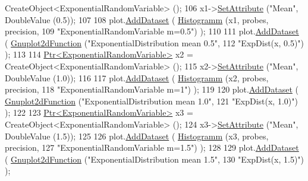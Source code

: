 \begin{DoxyCode}
      CreateObject<ExponentialRandomVariable> ();
106     x1->\hyperlink{classns3_1_1ObjectBase_ac60245d3ea4123bbc9b1d391f1f6592f}{SetAttribute} (\textcolor{stringliteral}{"Mean"}, DoubleValue (0.5));
107 
108     plot.\hyperlink{classns3_1_1Gnuplot_a306ec724a327cf9ab699700f31fca0a1}{AddDataset} ( \hyperlink{main-random-variable-stream_8cc_a2cfd3837ab3f2e816cf53486d7a186b5}{Histogramm} (x1, probes, precision,
109                                   \textcolor{stringliteral}{"ExponentialRandomVariable m=0.5"}) );
110 
111     plot.\hyperlink{classns3_1_1Gnuplot_a306ec724a327cf9ab699700f31fca0a1}{AddDataset} ( \hyperlink{classns3_1_1Gnuplot2dFunction}{Gnuplot2dFunction} (\textcolor{stringliteral}{"ExponentialDistribution mean 0.5"},
112                                          \textcolor{stringliteral}{"ExpDist(x, 0.5)"}) );
113 
114     \hyperlink{classns3_1_1Ptr}{Ptr<ExponentialRandomVariable>} x2 = 
      CreateObject<ExponentialRandomVariable> ();
115     x2->\hyperlink{classns3_1_1ObjectBase_ac60245d3ea4123bbc9b1d391f1f6592f}{SetAttribute} (\textcolor{stringliteral}{"Mean"}, DoubleValue (1.0));
116 
117     plot.\hyperlink{classns3_1_1Gnuplot_a306ec724a327cf9ab699700f31fca0a1}{AddDataset} ( \hyperlink{main-random-variable-stream_8cc_a2cfd3837ab3f2e816cf53486d7a186b5}{Histogramm} (x2, probes, precision,
118                                   \textcolor{stringliteral}{"ExponentialRandomVariable m=1"}) );
119 
120     plot.\hyperlink{classns3_1_1Gnuplot_a306ec724a327cf9ab699700f31fca0a1}{AddDataset} ( \hyperlink{classns3_1_1Gnuplot2dFunction}{Gnuplot2dFunction} (\textcolor{stringliteral}{"ExponentialDistribution mean 1.0"},
121                                          \textcolor{stringliteral}{"ExpDist(x, 1.0)"}) );
122 
123     \hyperlink{classns3_1_1Ptr}{Ptr<ExponentialRandomVariable>} x3 = 
      CreateObject<ExponentialRandomVariable> ();
124     x3->\hyperlink{classns3_1_1ObjectBase_ac60245d3ea4123bbc9b1d391f1f6592f}{SetAttribute} (\textcolor{stringliteral}{"Mean"}, DoubleValue (1.5));
125 
126     plot.\hyperlink{classns3_1_1Gnuplot_a306ec724a327cf9ab699700f31fca0a1}{AddDataset} ( \hyperlink{main-random-variable-stream_8cc_a2cfd3837ab3f2e816cf53486d7a186b5}{Histogramm} (x3, probes, precision,
127                                   \textcolor{stringliteral}{"ExponentialRandomVariable m=1.5"}) );
128 
129     plot.\hyperlink{classns3_1_1Gnuplot_a306ec724a327cf9ab699700f31fca0a1}{AddDataset} ( \hyperlink{classns3_1_1Gnuplot2dFunction}{Gnuplot2dFunction} (\textcolor{stringliteral}{"ExponentialDistribution mean 1.5"},
130                                          \textcolor{stringliteral}{"ExpDist(x, 1.5)"}) );

\end{DoxyCode}
